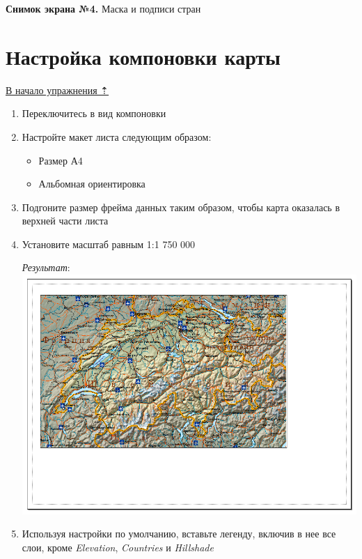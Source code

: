 \documentclass[]{book}
\providecommand{\tightlist}{%
  \setlength{\itemsep}{0pt}\setlength{\parskip}{0pt}}
\theoremstyle{definition}
\theoremstyle{definition}
\theoremstyle{definition}
\theoremstyle{remark}
\begin{document}
\textbf{Снимок экрана №4.} Маска и подписи стран

\hypertarget{map-design-general-layout}{%
\section{Настройка компоновки карты}\label{map-design-general-layout}}

\protect\hyperlink{map-design-general}{В начало упражнения ⇡}

\begin{enumerate}
\def\labelenumi{\arabic{enumi}.}
\item
  Переключитесь в вид компоновки
\item
  Настройте макет листа следующим образом:

  \begin{itemize}
  \tightlist
  \item
    Размер А4
  \item
    Альбомная ориентировка
  \end{itemize}
\item
  Подгоните размер фрейма данных таким образом, чтобы карта оказалась в
  верхней части листа
\item
  Установите масштаб равным 1:1 750 000

  \emph{Результат}: \includegraphics{images/Ex02/image25.png}
\item
  Используя настройки по умолчанию, вставьте легенду, включив в нее все
  слои, кроме \emph{Elevation}, \emph{Countries} и \emph{Hillshade}


\end{enumerate}
\end{document}
